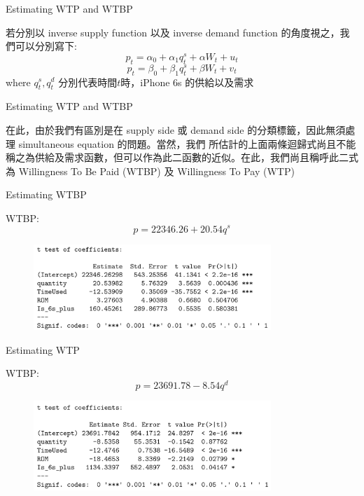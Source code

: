 \documentclass[11pt]{beamer}
\begin{document}
\begin{frame}[fragile]{Estimating WTP and WTBP}

若分別以 inverse supply function 以及 inverse demand function 的角度視之，我們可以分別寫下:
$$ p_t = \alpha_0 + \alpha_1 q_t^s + \alpha W_t + u_t$$
$$ p_t = \beta_0 + \beta_1 q_t^s + \beta W_t + v_t$$
where $q_t^s, q_t^d$ 分別代表時間$t$時，iPhone 6s 的供給以及需求

\end{frame}


\begin{frame}[fragile]{Estimating WTP and WTBP}

在此，由於我們有區別是在 supply side 或 demand side 的分類標籤，因此無須處理 simultaneous equation 的問題。當然，我們 所估計的上面兩條迴歸式尚且不能稱之為供給及需求函數，但可以作為此二函數的近似。在此，我們尚且稱呼此二式為 Willingness To Be Paid (WTBP) 及 Willingness To Pay (WTP)

\end{frame}


\begin{frame}[fragile]{Estimating WTBP}

WTBP:
$$p = 22346.26 + 20.54 q^s$$

	\begin{figure}
		\begin{center}
			\includegraphics[width=0.8\textwidth]{figure/f04.png}
		\end{center}
	\end{figure}

\end{frame}

\begin{frame}[fragile]{Estimating WTP}

WTBP:
$$p = 23691.78 - 8.54 q^d$$

	\begin{figure}
		\begin{center}
			\includegraphics[width=0.8\textwidth]{figure/f05.png}
		\end{center}
	\end{figure}

\end{frame}
\end{document}

